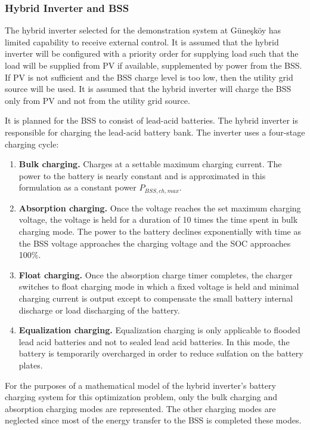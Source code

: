 \subsubsection{Hybrid Inverter and BSS}

The hybrid inverter selected for the demonstration system at Güneşköy has limited capability to receive external control. It is assumed that the hybrid inverter will be configured with a priority order for supplying load such that the load will be supplied from PV if available, supplemented by power from the BSS. If PV is not sufficient and the BSS charge level is too low, then the utility grid source will be used. It is assumed that the hybrid inverter will charge the BSS only from PV and not from the utility grid source.

It is planned for the BSS to consist of lead-acid batteries. The hybrid inverter is responsible for charging the lead-acid battery bank. The inverter uses a four-stage charging cycle\cite{Growatt_manual}:

\begin{enumerate}
	\item \textbf{Bulk charging.} Charges at a settable maximum charging current. The power to the battery is nearly constant and is approximated in this formulation as a constant power $P_{BSS,ch,max}$.
	\item \textbf{Absorption charging.} Once the voltage reaches the set maximum charging voltage, the voltage is held for a duration of 10 times the time spent in bulk charging mode. The power to the battery declines exponentially with time as the BSS voltage approaches the charging voltage and the SOC approaches 100\%.
	\item \textbf{Float charging.} Once the absorption charge timer completes, the charger switches to float charging mode in which a fixed voltage is held and minimal charging current is output except to compensate the small battery internal discharge or load discharging of the battery.
	\item \textbf{Equalization charging.} Equalization charging is only applicable to flooded lead acid batteries and not to sealed lead acid batteries. In this mode, the battery is temporarily overcharged in order to reduce sulfation on the battery plates.
\end{enumerate}

For the purposes of a mathematical model of the hybrid inverter's battery charging system for this optimization problem, only the bulk charging and absorption charging modes are represented. The other charging modes are neglected since most of the energy transfer to the BSS is completed these modes.

